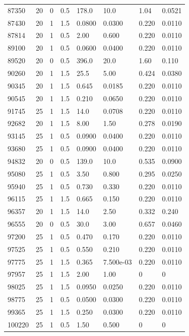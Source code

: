 \documentclass[preview]{standalone}
\begin{document}
{{{{{\begin{tabular}{L{1.2cm}C{1.2cm} C{0.3cm}C{0.5cm} C{1.4cm}C{1.4cm} C{1.4cm}C{1.4cm}}
  87350  &    20  & 0     & 0.5 &  178.0  & 10.0  & 1.04 &  0.0521   \\ 
  87430  &    20  & 1     & 1.5 &  0.0800  & 0.0300  & 0.220 &  0.0110   \\ 
  87814  &    20  & 1     & 0.5 &  2.00  & 0.600  & 0.220 &  0.0110   \\ 
  89100  &    20  & 1     & 0.5 &  0.0600  & 0.0400  & 0.220 &  0.0110   \\ 
  89520  &    20  & 0     & 0.5 &  396.0  & 20.0  & 1.60 &  0.110   \\ 
  90260  &    20  & 1     & 1.5 &  25.5  & 5.00  & 0.424 &  0.0380   \\ 
  90345  &    20  & 1     & 1.5 &  0.645  & 0.0185  & 0.220 &  0.0110   \\ 
  90545  &    20  & 1     & 1.5 &  0.210  & 0.0650  & 0.220 &  0.0110   \\ 
  91745  &    25  & 1     & 1.5 &  14.0  & 0.0708  & 0.220 &  0.0110   \\ 
  92682  &    20  & 1     & 1.5 &  8.00  & 1.50  & 0.278 &  0.0190   \\ 
  93145  &    25  & 1     & 0.5 &  0.0900  & 0.0400  & 0.220 &  0.0110   \\ 
  93680  &    25  & 1     & 0.5 &  0.0900  & 0.0400  & 0.220 &  0.0110   \\ 
  94832  &    20  & 0     & 0.5 &  139.0  & 10.0  & 0.535 &  0.0900   \\ 
  95080  &    25  & 1     & 0.5 &  3.50  & 0.800  & 0.295 &  0.0250   \\ 
  95940  &    25  & 1     & 0.5 &  0.730  & 0.330  & 0.220 &  0.0110   \\ 
  96115  &    25  & 1     & 1.5 &  0.665  & 0.150  & 0.220 &  0.0110   \\ 
  96357  &    20  & 1     & 1.5 &  14.0  & 2.50  & 0.332 &  0.240   \\ 
  96555  &    20  & 0     & 0.5 &  30.0  & 3.00  & 0.657 &  0.0460   \\ 
  97200  &    25  & 1     & 0.5 &  0.470  & 0.170  & 0.220 &  0.0110   \\ 
  97525  &    25  & 1     & 0.5 &  0.550  & 0.210  & 0.220 &  0.0110   \\ 
  97775  &    25  & 1     & 1.5 &  0.365  & 7.500e-03  & 0.220 &  0.0110   \\ 
  97957  &    25  & 1     & 1.5 &  2.00  & 1.00  & 0 &  0   \\ 
  98025  &    25  & 1     & 1.5 &  0.0950  & 0.0250  & 0.220 &  0.0110   \\ 
  98775  &    25  & 1     & 0.5 &  0.0500  & 0.0300  & 0.220 &  0.0110   \\ 
  99365  &    25  & 1     & 1.5 &  0.250  & 0.0300  & 0.220 &  0.0110   \\ 
  100220  &    25  & 1     & 0.5 &  1.50  & 0.500  & 0 &  0   \\ 
\hline 
\end{tabular} 

}}}}}
\end{document}
